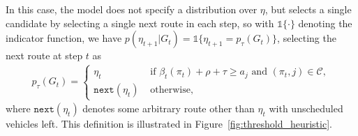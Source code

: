 \documentclass[a4paper]{article}
\theoremstyle{definition}
\theoremstyle{plain}
\begin{document}
In this case, the model does not specify a distribution over $\eta$, but selects
a single candidate by selecting a single next route in each step, so with
$\mathds{1}\{ \cdot \}$ denoting the indicator function, we have
$p(\eta_{t+1} | G_{t}) = \mathds{1}\{ \eta_{t+1} = p_{\tau}(G_{t}) \}$,
selecting the next route at step $t$ as
\begin{align*}
  p_{\tau}(G_{t}) = \begin{cases}
                \eta_{t} \quad &\text{ if } \beta_{t}(\pi_{t}) + \rho + \tau \geq a_{j} \text{ and } (\pi_{t},j) \in \mathcal{C} , \\
                \texttt{next}(\eta_{t}) & \text{ otherwise, }
              \end{cases}
\end{align*}
where $\texttt{next}(\eta_{t})$ denotes some arbitrary route other than $\eta_{t}$ with
unscheduled vehicles left.
%
This definition is illustrated in Figure~\ref{fig:threshold_heuristic}.
\end{document}
